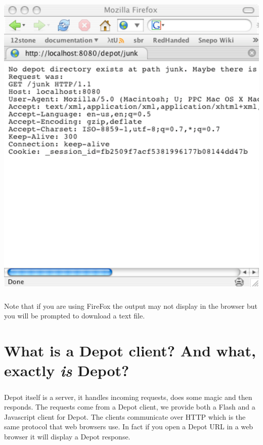 \documentclass{report}
\begin{document}
\begin{center}
\includegraphics[scale=0.70]{wiki-tutorial-images/wiki-screenshot-404.pdf}
\end{center} 

\paragraph{}
Note that if you are using FireFox the output may not display in the
browser but you will be prompted to download a text file. 

\chapter{What is a Depot client? And what, exactly \textit{is}
  Depot? }

\paragraph{}
Depot itself is a server, it handles incoming requests, does some
magic and then responds. The requests come from a Depot client, we
provide both a Flash and a Javascript client for Depot. The clients
communicate over HTTP which is the same protocol that web browsers
use. In fact if you open a Depot URL in a web browser it will display
a Depot response.
\end{document}
